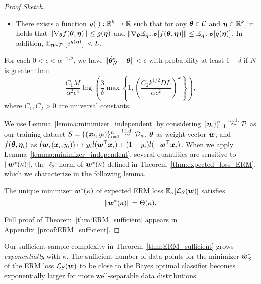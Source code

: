 \begin{proof}[Proof Sketch]
\begin{lemma}
\begin{itemize}[leftmargin=3.5mm]
\item There exists a function $g(\cdot): \mathbb{R}^k \rightarrow \mathbb{R}$ such that for any ${\bm{\theta}} \in \mathcal{C}$ and ${\bm{\eta}} \in \mathbb{R}^k$, it holds that $\lVert \nabla_{\bm{\theta}} f({\bm{\theta}},{\bm{\eta}}) \rVert \leq g({\bm{\eta}})$ and $\lVert \nabla_{\bm{\theta}} \mathbb{E}_{{\bm{\eta}} \sim \mathcal{P}}[f({\bm{\theta}}, {\bm{\eta}})]\rVert \leq \mathbb{E}_{{\bm{\eta}} \sim \mathcal{P}}[g({\bm{\eta}})]$. In addition, $\mathbb{E}_{{\bm{\eta}} \sim \mathcal{P}}\left[ e^{g({\bm{\eta}})}\right]< L$.
\end{itemize}
\vspace*{-5pt}
For each $0<\epsilon< \alpha^{-1/2}$, we have $\lVert \hat{{\bm{\theta}}}_N^* - {\bm{\theta}} \rVert < \epsilon$ with probability at least $1- \delta$  if $N$ is greater than
\begin{equation*}
\frac{C_1 M}{ \alpha^2 \epsilon^4} \log\left(\frac{3}{\delta} \max \left \{1, \left(\frac{C_2 k^{1/2} D L}{\alpha \epsilon^2 }\right)^k \right\} \right),
\end{equation*}
where $C_1, C_2>0$ are universal constants.
\end{lemma}

We use Lemma~\ref{lemma:minimizer_independent} by considering $\{ {\bm{\eta}}_i\}_{i=1}^n \overset{\mathrm{i.i.d.}}{\sim} \mathcal{P}$ as our training dataset $S = \{({\bm{x}}_i,y_i)\}_{i=1}^n \overset{\mathrm{i.i.d.}}{\sim} \mathcal{D}_\kappa$, ${\bm{\theta}}$ as weight vector ${\bm{w}}$, and $f({\bm{\theta}}, {\bm{\eta}}_i)$ as $({\bm{w}}, ({\bm{x}}_i,y_i)) \mapsto y_i l({\bm{w}}^\top {\bm{x}}_i) + (1-y_i) l(-{\bm{w}}^\top {\bm{x}}_i)$.
When we apply Lemma~\ref{lemma:minimizer_independent}, several quantities are sensitive to $\lVert {\bm{w}}^*(\kappa) \rVert$, the $\ell_2$ norm of ${\bm{w}}^*(\kappa)$ defined in Theorem~\ref{thm:expected_loss_ERM}, which we characterize in the following lemma.
\vspace{-5pt}
\begin{lemma}\label{lemma:ERM_norm} The unique minimizer ${\bm{w}}^*(\kappa)$ of expected ERM loss $\mathbb{E}_\kappa [\mathcal{L}_S ({\bm{w}})]$ satisfies
\begin{equation*}
    \lVert {\bm{w}}^*(\kappa) \rVert = \Theta (\kappa).
\end{equation*}
\end{lemma}
\vspace*{-10pt}
Full proof of Theorem~\ref{thm:ERM_sufficient} appears in Appendix~\ref{proof:ERM_sufficient}.
\end{proof}
\vspace{-10pt}
Our sufficient sample complexity in Theorem~\ref{thm:ERM_sufficient} grows \emph{exponentially} with $\kappa$. The sufficient number of data points for the minimizer $\hat{{\bm{w}}}_S^*$ of the ERM loss $\mathcal{L}_S({\bm{w}})$ to be close to the Bayes optimal classifier becomes exponentially larger for more well-separable data distributions. 

